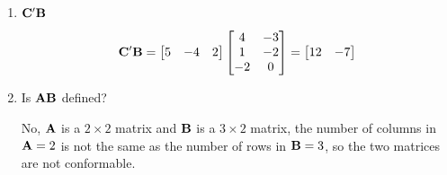 \begin{enumerate}[label=(\alph*)]
            \item $\bold{C}^\prime \bold{B}$
            

            \[
                \bold{C}^\prime \bold{B} =
                \begin{bmatrix}
                    5 & -4 & 2
                \end{bmatrix}
                \begin{bmatrix}
                    4  & -3 \\
                    1  & -2 \\
                    -2 &  0
                \end{bmatrix} =
                \begin{bmatrix}
                    12  & -7
                \end{bmatrix}
            \]


            \item Is $\bold{AB}$ defined?
            

            No, $\bold{A}$ is a $2 \times 2$ matrix and $\bold{B}$ is a $3 \times 2$ matrix, 
            the number of columns in $\bold{A} = 2$ is not the same as the number of rows in $\bold{B} = 3$, so the two matrices are not conformable.
            \end{enumerate}